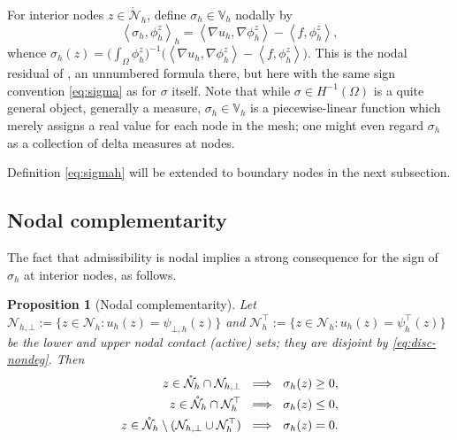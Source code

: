 \documentclass[12pt]{amsart}
\numberwithin{equation}{section}
\theoremstyle{plain}
\newtheorem{proposition}[theorem]{Proposition}
\theoremstyle{definition}
\theoremstyle{remark}
\newcommand{\Om}{\Omega}
\newcommand{\psiloh}{\psi_{\bot,h}}
\newcommand{\psiuph}{\psi^\top_h}
\newcommand{\Vh}{\mathbb{V}_h}
\newcommand{\Nh}{\mathcal{N}_h}
\newcommand{\Nhr}{\mathring{\mathcal{N}}_h}
\newcommand{\Nhbot}{\mathcal{N}_{h,\bot}}
\newcommand{\Nhtop}{\Nh^\top}
\begin{document}
For interior nodes $z \in \Nhr$, define $\sigma_h \in \Vh$ nodally by
\begin{equation}
\label{eq:sigmah}
  \left< \sigma_h, \phi_h^z \right>_h
  = \left< \nabla u_h, \nabla \phi_h^z \right> - \left< f, \phi_h^z \right>,
\end{equation}
whence $\sigma_h(z) = \bigl(\int_\Om \phi_h^z\bigr)^{-1}
\bigl(\left< \nabla u_h, \nabla \phi_h^z\right> - \left< f, \phi_h^z\right>\bigr)$.  This is the nodal residual of \cite[\S 2.1]{NSV03}, an unnumbered formula there, but here with the same sign convention \eqref{eq:sigma} as for $\sigma$ itself.  Note that while $\sigma \in H^{-1}(\Om)$ is a quite general object, generally a measure, $\sigma_h \in \Vh$ is a piecewise-linear function which merely assigns a real value for each node in the mesh; one might even regard $\sigma_h$ as a collection of delta measures at nodes.

Definition \eqref{eq:sigmah} will be extended to boundary nodes in the next subsection.

\subsection{Nodal complementarity}  The fact that admissibility is nodal implies a strong consequence for the sign of $\sigma_h$ at interior nodes, as follows.

\begin{proposition}[Nodal complementarity] \label{prop:nodalsign}  Let $\Nhbot := \{z \in \Nh : u_h(z) = \psiloh(z)\}$ and $\Nhtop := \{z \in \Nh : u_h(z) = \psiuph(z)\}$ be the lower and upper \emph{nodal contact (active) sets}; they are disjoint by \eqref{eq:disc-nondeg}.  Then
\begin{align}
\label{eq:nodalcomp}
  z \in \Nhr \cap \Nhbot \ &\implies\ \sigma_h(z) \ge 0, \\
  z \in \Nhr \cap \Nhtop \ &\implies\ \sigma_h(z) \le 0, \notag \\
  z \in \Nhr \setminus (\Nhbot \cup \Nhtop) \ &\implies\ \sigma_h(z) = 0. \notag
\end{align}
\end{proposition}
\end{document}

